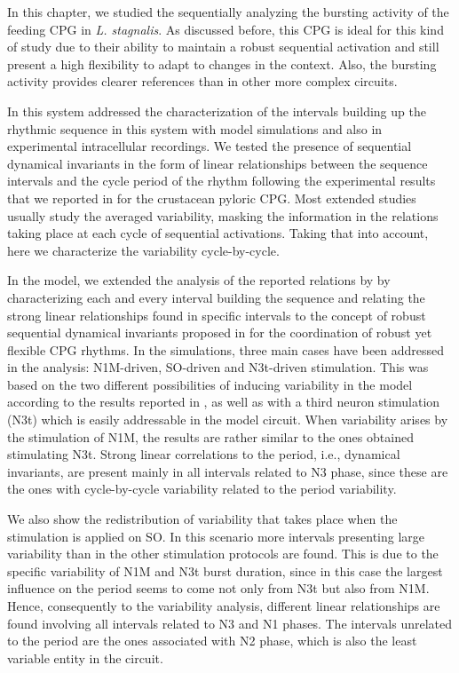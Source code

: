 In this chapter, we studied the sequentially analyzing the bursting activity of the feeding CPG in \textit{L. stagnalis}. As discussed before, this CPG is ideal for this kind of study due to their ability to maintain a robust sequential activation and still present a high flexibility to adapt to changes in the context. Also, the bursting activity provides clearer references than in other more complex circuits. 

In this system addressed the characterization of the intervals building up the rhythmic sequence in this system with model simulations and also in experimental intracellular recordings. We tested the presence of sequential dynamical invariants in the form of linear relationships between the sequence intervals and the cycle period of the rhythm following the experimental results that we reported in \cite{elices_robust_2019} for the crustacean pyloric CPG. Most extended studies usually study the averaged variability, masking the information in the relations taking place at each cycle of sequential activations. Taking that into account, here we characterize the variability cycle-by-cycle. 

In the model, we extended the analysis of the reported relations by \cite{Elliott1991} by characterizing each and every interval building the sequence and relating the strong linear relationships found in specific intervals to the concept of robust sequential dynamical invariants proposed in \cite{elices_robust_2019} for the coordination of robust yet flexible CPG rhythms. In the simulations, three main cases have been addressed in the analysis: N1M-driven, SO-driven and N3t-driven stimulation. This was based on the two different possibilities of inducing variability in the model according to the results reported in \cite{vavoulis_dynamic_2007}, as well as with a third neuron stimulation (N3t) which is easily addressable in the model circuit. When variability arises by the stimulation of N1M, the results are rather similar to the ones obtained stimulating N3t. Strong linear correlations to the period, i.e.,  dynamical invariants, are present mainly in all intervals related to N3 phase, since these are the ones with cycle-by-cycle variability related to the period variability.  

We also show the redistribution of variability that takes place when the stimulation is applied on SO. In this scenario more intervals presenting large variability than in the other stimulation protocols are found. This is due to the specific variability of N1M and N3t burst duration, since in this case the largest influence on the period seems to come not only from N3t but also from N1M. Hence, consequently to the variability analysis, different linear relationships are found involving all intervals related to N3 and N1 phases. The intervals unrelated to the period are the ones associated with N2 phase, which is also the least variable entity in the circuit. 

